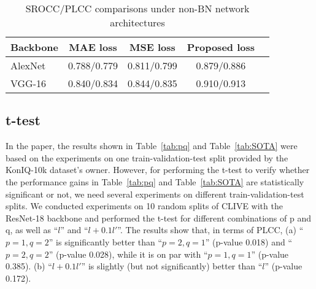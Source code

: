 \documentclass[sigconf]{acmart}
\begin{document}
\begin{table}[!htb]
\centering
\caption{SROCC/PLCC comparisons under non-BN network architectures}
\label{tab:architecture}
\begin{tabular}{lcccc}  
\toprule
Backbone & MAE loss & MSE loss & Proposed loss \\
\midrule
AlexNet & 0.788/0.779 & 0.811/0.799 & 0.879/0.886 \\
VGG-16 & 0.840/0.834 & 0.844/0.835 & 0.910/0.913 \\
\bottomrule
\end{tabular}
\end{table}

\subsection{t-test}
In the paper, the results shown in Table~\ref{tab:pq} and Table~\ref{tab:SOTA} were based on the experiments on one train-validation-test split provided by the KonIQ-10k dataset's owner. However, for performing the t-test to verify whether the performance gains in Table~\ref{tab:pq} and Table~\ref{tab:SOTA} are statistically significant or not, we need several experiments on different train-validation-test splits.
We conducted experiments on 10 random splits of CLIVE with the ResNet-18 backbone and performed the t-test for different combinations of p and q, as well as ``$l$'' and ``$l+0.1l'$''. 
The results show that, in terms of PLCC, 
(a) ``$p=1, q=2$'' is significantly better than ``$p=2, q=1$'' (p-value 0.018) and ``$p=2, q=2$'' (p-value 0.028), while it is on par with ``$p=1, q=1$'' (p-value 0.385). 
(b) ``$l+0.1l'$'' is slightly (but not significantly) better than ``$l$'' (p-value 0.172).
\end{document}
